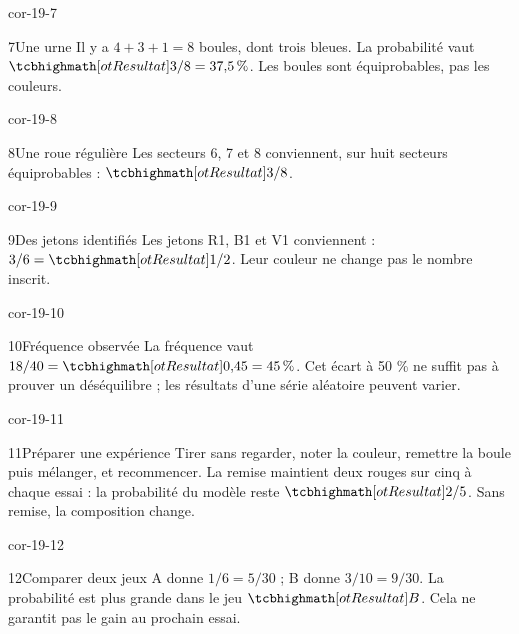\begin{blocLivre}{cor-19-7}\begin{corrige}{7}{Une urne}
Il y a $4+3+1=8$ boules, dont trois bleues. La probabilité vaut $\res{3/8=37{,}5\,\%}$. Les boules sont équiprobables, pas les couleurs.
\label{fig-cor-19-7}
\end{corrige}\end{blocLivre}
\begin{blocLivre}{cor-19-8}\begin{corrige}{8}{Une roue régulière}
Les secteurs 6, 7 et 8 conviennent, sur huit secteurs équiprobables : $\res{3/8}$.
\label{fig-cor-19-8}
\end{corrige}\end{blocLivre}
\begin{blocLivre}{cor-19-9}\begin{corrige}{9}{Des jetons identifiés}
Les jetons R1, B1 et V1 conviennent : $3/6=\res{1/2}$. Leur couleur ne change pas le nombre inscrit.
\label{fig-cor-19-9}
\end{corrige}\end{blocLivre}
\begin{blocLivre}{cor-19-10}\begin{corrige}{10}{Fréquence observée}
La fréquence vaut $18/40=\res{0{,}45=45\,\%}$. Cet écart à 50 \% ne suffit pas à prouver un déséquilibre ; les résultats d’une série aléatoire peuvent varier.
\end{corrige}\end{blocLivre}
\begin{blocLivre}{cor-19-11}\begin{corrige}{11}{Préparer une expérience}
Tirer sans regarder, noter la couleur, remettre la boule puis mélanger, et recommencer. La remise maintient deux rouges sur cinq à chaque essai : la probabilité du modèle reste $\res{2/5}$. Sans remise, la composition change.
\label{fig-cor-19-11}
\end{corrige}\end{blocLivre}
\begin{blocLivre}{cor-19-12}\begin{corrige}{12}{Comparer deux jeux}
A donne $1/6=5/30$ ; B donne $3/10=9/30$. La probabilité est plus grande dans le jeu $\res B$. Cela ne garantit pas le gain au prochain essai.
\end{corrige}\end{blocLivre}
